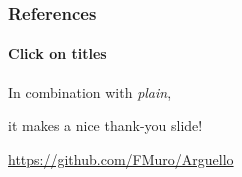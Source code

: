 \documentclass{beamer}
\begin{document}
\begin{frame}[allowframebreaks]
      \frametitle{References}
      \framesubtitle{Click on titles}
      \nocite{*}
      \printbibliography[heading=none]
\end{frame}

\ThankYou
\begin{frame}
      In combination with \textit{plain},\par
      it makes a nice thank-you slide!
      \vfill\scalebox{4}{\faGithub}\par\bigskip
      \url{https://github.com/FMuro/Arguello}
\end{frame}
\end{document}
